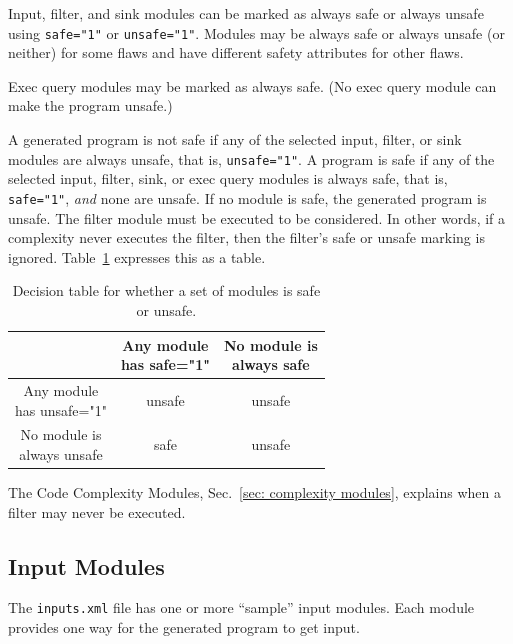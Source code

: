 Input, filter, and sink modules can be marked as always safe or always unsafe using
\linebreak %
\verb|safe="1"| or \verb|unsafe="1"|.  Modules may be always safe or always unsafe
(or neither) for some flaws and have different safety attributes for other
flaws.

Exec query modules may be marked as always safe.  (No exec query module can make the
program unsafe.)

A generated program is not safe if any of the selected input, filter, or sink modules
are always unsafe, that is, \verb|unsafe="1"|.  A program is safe if any of the
selected input, filter, sink, or exec query modules is always safe, that is,
\verb|safe="1"|, \emph{and} none
are unsafe.  If no module is safe, the generated program is unsafe.
The filter module must be executed to be considered.  In other words, if
a complexity never executes the filter, then the filter's safe or unsafe marking is
ignored.  Table~\ref{tab:selection safe algorithm} expresses this as a table.

\begin{table}[H]
\centering
\caption{Decision table for whether a set of modules is safe or unsafe.}
\begin{tabular}{c|c|c|}
  & \makecell{Any module \\ has safe="1"}
  & \makecell{No module is \\ always safe} \\
\hline
\makecell{Any module \\ has unsafe="1"}  & unsafe & unsafe \\
\hline
\makecell{No module is \\ always unsafe} &   safe   & unsafe \\
\hline
\end{tabular}
\label{tab:selection safe algorithm}
\end{table}

The Code Complexity Modules, Sec.~\ref{sec: complexity modules}, explains when a
filter may never be executed.


\subsection{Input Modules}
\label{sec: input module}

The \verb|inputs.xml| file has one or more ``sample'' input modules.  Each module
provides one way for the generated program to get input.

